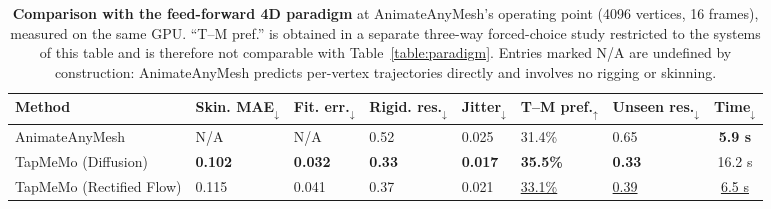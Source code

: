 \documentclass[lettersize,journal]{IEEEtran}
\newcommand{\blu}[1]{\texorpdfstring{{\leavevmode\color{blue}#1}}{#1}}
\begin{document}
\begin{table}[t]
  \centering
  \scriptsize
  \setlength{\abovecaptionskip}{0.5mm}
  \setlength{\belowcaptionskip}{0mm}
  \renewcommand{\arraystretch}{1.3}
  \caption{\blu{\textbf{Comparison with the feed-forward 4D paradigm} at AnimateAnyMesh's operating point
  (4096 vertices, 16 frames), measured on the same GPU. ``T--M pref.'' is obtained in a separate
  three-way forced-choice study restricted to the systems of this table and is therefore not
  comparable with Table~\ref{table:paradigm}. Entries marked N/A are undefined by construction:
  AnimateAnyMesh predicts per-vertex trajectories directly and involves no rigging or skinning.}}
  \begin{tabularx}{\linewidth}{l >{\centering\arraybackslash}X >{\centering\arraybackslash}X
    >{\centering\arraybackslash}X >{\centering\arraybackslash}X >{\centering\arraybackslash}X
    >{\centering\arraybackslash}X c}
    \toprule[1.5pt]
    \blu{\textbf{Method}} & \blu{\textbf{Skin. MAE}$_{\downarrow}$} & \blu{\textbf{Fit. err.}$_{\downarrow}$} &
    \blu{\textbf{Rigid. res.}$_{\downarrow}$} & \blu{\textbf{Jitter}$_{\downarrow}$} &
    \blu{\textbf{T--M pref.}$_{\uparrow}$} & \blu{\textbf{Unseen res.}$_{\downarrow}$} &
    \blu{\textbf{Time}$_{\downarrow}$} \\
    \midrule[0.5pt]
    \blu{AnimateAnyMesh} & \blu{N/A} & \blu{N/A} & \blu{0.52} & \blu{0.025} & \blu{31.4}\% & \blu{0.65} & \blu{\textbf{5.9 s}} \\
    \midrule[0.5pt]
    \blu{TapMeMo (Diffusion)} & \blu{\textbf{0.102}} & \blu{\textbf{0.032}} & \blu{\textbf{0.33}} & \blu{\textbf{0.017}} & \blu{\textbf{35.5\%}} & \blu{\textbf{0.33}} & \blu{16.2 s} \\
    \blu{TapMeMo (Rectified Flow)} & \blu{0.115} & \blu{0.041} & \blu{0.37} & \blu{0.021} & \blu{\underline{33.1\%}} & \blu{\underline{0.39}} & \blu{\underline{6.5 s}} \\
    \bottomrule[1.5pt]
  \end{tabularx}
  \label{table:feedforward}
\end{table}
\end{document}
